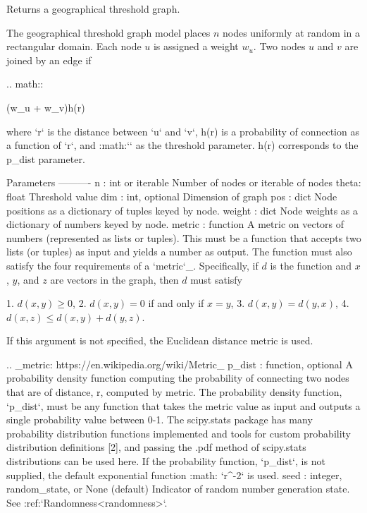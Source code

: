 \begin{DoxyVerb}Returns a geographical threshold graph.

The geographical threshold graph model places $n$ nodes uniformly at
random in a rectangular domain.  Each node $u$ is assigned a weight
$w_u$. Two nodes $u$ and $v$ are joined by an edge if

.. math::

   (w_u + w_v)h(r) \ge \theta

where `r` is the distance between `u` and `v`, h(r) is a probability of
connection as a function of `r`, and :math:`\theta` as the threshold
parameter. h(r) corresponds to the p_dist parameter.

Parameters
----------
n : int or iterable
    Number of nodes or iterable of nodes
theta: float
    Threshold value
dim : int, optional
    Dimension of graph
pos : dict
    Node positions as a dictionary of tuples keyed by node.
weight : dict
    Node weights as a dictionary of numbers keyed by node.
metric : function
    A metric on vectors of numbers (represented as lists or
    tuples). This must be a function that accepts two lists (or
    tuples) as input and yields a number as output. The function
    must also satisfy the four requirements of a `metric`_.
    Specifically, if $d$ is the function and $x$, $y$,
    and $z$ are vectors in the graph, then $d$ must satisfy

    1. $d(x, y) \ge 0$,
    2. $d(x, y) = 0$ if and only if $x = y$,
    3. $d(x, y) = d(y, x)$,
    4. $d(x, z) \le d(x, y) + d(y, z)$.

    If this argument is not specified, the Euclidean distance metric is
    used.

    .. _metric: https://en.wikipedia.org/wiki/Metric_%
p_dist : function, optional
    A probability density function computing the probability of
    connecting two nodes that are of distance, r, computed by metric.
    The probability density function, `p_dist`, must
    be any function that takes the metric value as input
    and outputs a single probability value between 0-1.
    The scipy.stats package has many probability distribution functions
    implemented and tools for custom probability distribution
    definitions [2], and passing the .pdf method of scipy.stats
    distributions can be used here. If the probability
    function, `p_dist`, is not supplied, the default exponential function
    :math: `r^{-2}` is used.
seed : integer, random_state, or None (default)
    Indicator of random number generation state.
    See :ref:`Randomness<randomness>`.


\end{DoxyVerb}
